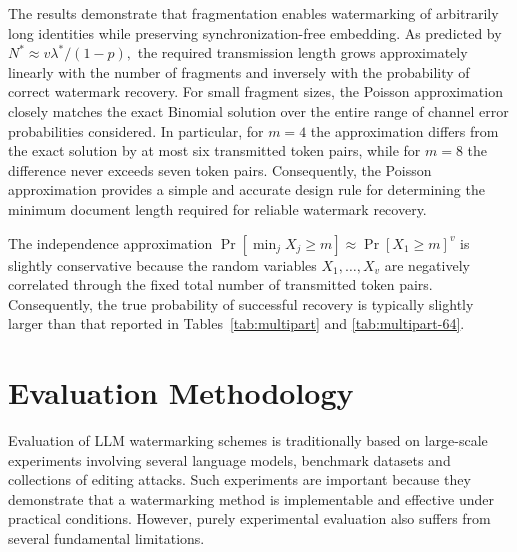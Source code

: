 \documentclass[a4paper,11pt]{llncs}
\begin{document}

The results demonstrate that fragmentation enables watermarking of
arbitrarily long identities while preserving synchronization-free
embedding. As predicted by
$
N^*\approx v\lambda^*/(1-p),
$
the required transmission length grows approximately linearly with the
number of fragments and inversely with the probability of correct
watermark recovery.
%
For small fragment sizes, the Poisson approximation closely matches the
exact Binomial solution over the entire range of channel error
probabilities considered. In particular, for $m=4$ the approximation
differs from the exact solution by at most six transmitted token pairs,
while for $m=8$ the difference never exceeds seven token pairs.
Consequently, the Poisson approximation provides a simple and accurate
design rule for determining the minimum document length required for
reliable watermark recovery.

\begin{remark}
The independence approximation
$
\Pr[\min_jX_j\ge m]\approx\Pr[X_1\ge m]^v
$
is slightly conservative because the random variables
$X_1,\ldots,X_v$ are negatively correlated through the fixed total
number of transmitted token pairs. Consequently, the true probability of
successful recovery is typically slightly larger than that reported in
Tables~\ref{tab:multipart} and
\ref{tab:multipart-64}.
\end{remark}


\section{Evaluation Methodology}
\label{sec:evaluation}

Evaluation of LLM watermarking schemes is traditionally based on
large-scale experiments involving several language models, benchmark
datasets and collections of editing attacks. Such experiments are
important because they demonstrate that a watermarking method is
implementable and effective under practical conditions. However, purely
experimental evaluation also suffers from several fundamental
limitations.
\end{document}
